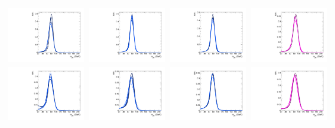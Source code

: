 \begin{figure}[htbp]
  \centering
  \includegraphics[width=0.18\textwidth]{fig/2Dfit/templateSignalVsMX_fromDC_VBFGbuToWW_MJJ_mu_HP_bb_HDy.pdf}
  \includegraphics[width=0.18\textwidth]{fig/2Dfit/templateSignalVsMX_fromDC_VBFRadToWW_MJJ_mu_HP_bb_HDy.pdf}
  \includegraphics[width=0.18\textwidth]{fig/2Dfit/templateSignalVsMX_fromDC_VBFZprToWW_MJJ_mu_HP_bb_HDy.pdf}
  \includegraphics[width=0.18\textwidth]{fig/2Dfit/templateSignalVsMX_fromDC_VBFWprToWZ_MJJ_mu_HP_bb_HDy.pdf}\\
  \includegraphics[width=0.18\textwidth]{fig/2Dfit/templateSignalVsMX_fromDC_VBFGbuToWW_MJJ_mu_LP_bb_HDy.pdf}
  \includegraphics[width=0.18\textwidth]{fig/2Dfit/templateSignalVsMX_fromDC_VBFRadToWW_MJJ_mu_LP_bb_HDy.pdf}
  \includegraphics[width=0.18\textwidth]{fig/2Dfit/templateSignalVsMX_fromDC_VBFZprToWW_MJJ_mu_LP_bb_HDy.pdf}
  \includegraphics[width=0.18\textwidth]{fig/2Dfit/templateSignalVsMX_fromDC_VBFWprToWZ_MJJ_mu_LP_bb_HDy.pdf}\\

\end{figure}
